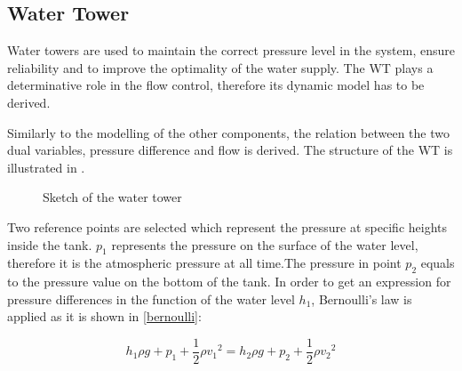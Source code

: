 \subsection{Water Tower} 
\label{WaterTankModel}

Water towers are used to maintain the correct pressure level in the system, ensure reliability and to improve the optimality of the water supply. The WT plays a determinative role in the flow control, therefore its dynamic model has to be derived. 

Similarly to the modelling of the other components, the relation between the two dual variables, pressure difference and flow is  derived. The structure of the WT is illustrated in .


\begin{figure}[H]
\centering
 
\caption{Sketch of the water tower}
\label{fig:watertower_sketch}
\end{figure}

Two reference points are selected which represent the pressure at specific heights inside the tank. $p_1$ represents the pressure on the surface of the water level, therefore it is the atmospheric pressure at all time.The pressure in point $p_2$ equals to the pressure value on the bottom of the tank. In order to get an expression for pressure differences in the function of the water level $h_1$, Bernoulli's law is applied as it is shown in \eqref{bernoulli}: 

\begin{equation}
  \label{bernoulli}
  h_1\rho g + p_1 + \frac{1}{2}\rho {v_1}^2 = h_2\rho g + p_2 + \frac{1}{2}\rho {v_2}^2
\end{equation}

